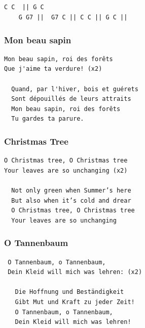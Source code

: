 \documentclass[
]{article}
\begin{document}
\hypertarget{section}{%
\subsection*{}\label{section}}

\begin{verbatim}
C C  || G C
    G G7 ||  G7 C || C C || G C || 
\end{verbatim}

\hypertarget{mon-beau-sapin}{%
\subsubsection*{Mon beau sapin}\label{mon-beau-sapin}}

\begin{verbatim}
Mon beau sapin, roi des forêts 
Que j'aime ta verdure! (x2)

  Quand, par l'hiver, bois et guérets 
  Sont dépouillés de leurs attraits 
  Mon beau sapin, roi des forêts 
  Tu gardes ta parure.
\end{verbatim}

\hypertarget{christmas-tree}{%
\subsubsection*{Christmas Tree}\label{christmas-tree}}

\begin{verbatim}
O Christmas tree, O Christmas tree
Your leaves are so unchanging (x2)

  Not only green when Summer’s here
  But also when it’s cold and drear
  O Christmas tree, O Christmas tree
  Your leaves are so unchanging
\end{verbatim}

\hypertarget{o-tannenbaum}{%
\subsubsection*{O Tannenbaum}\label{o-tannenbaum}}

\begin{verbatim}
 O Tannenbaum, o Tannenbaum,
 Dein Kleid will mich was lehren: (x2)
 
   Die Hoffnung und Beständigkeit
   Gibt Mut und Kraft zu jeder Zeit!
   O Tannenbaum, o Tannenbaum,
   Dein Kleid will mich was lehren!
\end{verbatim}
\end{document}
